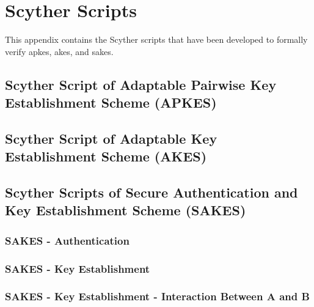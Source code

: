 \chapter{Scyther Scripts}
\label{app:listings}

This appendix contains the Scyther scripts that have been developed to formally verify \gls{apkes}, \gls{akes}, and \gls{sakes}.

\section{Scyther Script of Adaptable Pairwise Key Establishment Scheme (APKES)}
\label{app:apkes}


\section{Scyther Script of Adaptable Key Establishment Scheme (AKES)}
\label{app:akes}


\newpage

\section{Scyther Scripts of Secure Authentication and Key Establishment Scheme (SAKES)}
\label{app:sakes}

\subsection{SAKES - Authentication}
\label{app:sakes-auth}


\subsection{SAKES - Key Establishment}
\label{app:sakes-keys}


\subsection{SAKES - Key Establishment - Interaction Between A and B}
\label{app:sakes-keys-ab}


